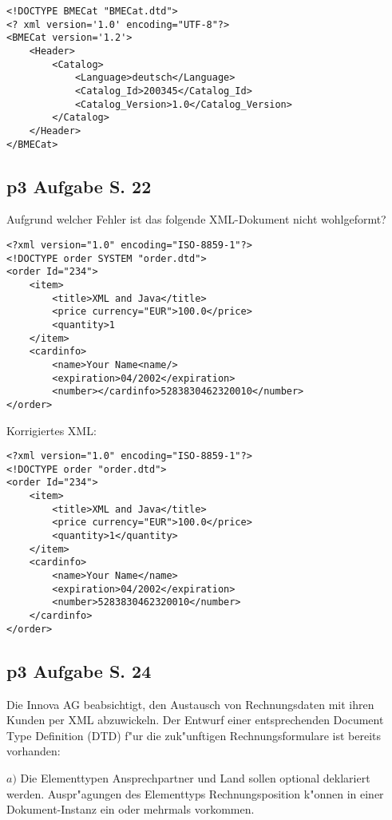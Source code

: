 \lstset{style=customXML}
\begin{lstlisting}
<!DOCTYPE BMECat "BMECat.dtd">
<? xml version='1.0' encoding="UTF-8"?>
<BMECat version='1.2'>
    <Header>
        <Catalog>
            <Language>deutsch</Language>
            <Catalog_Id>200345</Catalog_Id>
            <Catalog_Version>1.0</Catalog_Version>
        </Catalog>
    </Header>
</BMECat>
\end{lstlisting}




\subsection{p3 Aufgabe S. 22}
Aufgrund welcher Fehler ist das folgende XML-Dokument nicht wohlgeformt?

\lstset{style=customXML}
\begin{lstlisting}
<?xml version="1.0" encoding="ISO-8859-1"?>
<!DOCTYPE order SYSTEM "order.dtd">
<order Id="234">
    <item>
        <title>XML and Java</title>
        <price currency="EUR">100.0</price>
        <quantity>1
    </item>
    <cardinfo>
        <name>Your Name<name/>
        <expiration>04/2002</expiration>
        <number></cardinfo>5283830462320010</number>
</order>
\end{lstlisting}

Korrigiertes XML:
\lstset{style=customXML}
\begin{lstlisting}
<?xml version="1.0" encoding="ISO-8859-1"?>
<!DOCTYPE order "order.dtd">
<order Id="234">
    <item>
        <title>XML and Java</title>
        <price currency="EUR">100.0</price>
        <quantity>1</quantity>
    </item>
    <cardinfo>
        <name>Your Name</name>
        <expiration>04/2002</expiration>
        <number>5283830462320010</number>
    </cardinfo>
</order>
\end{lstlisting}


\subsection{p3 Aufgabe S. 24}

Die Innova AG beabsichtigt, den Austausch von Rechnungsdaten mit ihren Kunden per XML abzuwickeln.
Der Entwurf einer entsprechenden Document Type Definition (DTD) f"ur die zuk"unftigen Rechnungsformulare ist bereits vorhanden:

\noindent
$a)$ Die Elementtypen Ansprechpartner und Land sollen optional deklariert werden.
Auspr"agungen des Elementtyps Rechnungsposition k"onnen in einer Dokument-Instanz ein oder mehrmals vorkommen.\\

